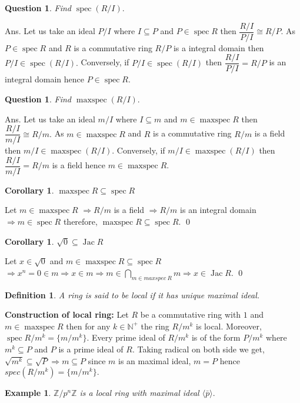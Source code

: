 \documentclass[11pt]{amsart}
\newtheorem{definition}[theorem]{Definition}%
\newtheorem{qns}[theorem]{Question}
\newtheorem{example}[theorem]{Example}%
\newtheorem{corollary}[theorem]{Corollary}%
\newcommand{\ZZ}{\mathbb Z}
\newcommand{\NN}{\mathbb N}
\newcommand{\gen}[1]{\langle#1\rangle}
\begin{document}
\begin{qns}
Find $\operatorname{spec}(R/I).$
\end{qns}
Ans. Let us take an ideal $P/I$ where $I\subseteq P$ and $P\in \operatorname{spec}R$ then $\dfrac{R/I}{P/I}\cong R/P.$ As $P\in \operatorname{spec}R$ and $R$ is a commutative ring $R/P$ is a integral domain then $P/I\in \operatorname{spec}(R/I).$ Conversely, if $P/I\in \operatorname{spec}(R/I)$ then $\dfrac{R/I}{P/I}=R/P$ is an integral domain hence $P\in \operatorname{spec}R.$ 
\begin{qns}
Find $\operatorname{maxspec}(R/I).$
\end{qns}
Ans. Let us take an ideal $m/I$ where $I\subseteq m$ and $m\in \operatorname{maxspec}R$ then $\dfrac{R/I}{m/I}\cong R/m.$ As $m\in \operatorname{maxspec}R$ and $R$ is a commutative ring $R/m$ is a field then $m/I\in \operatorname{maxspec}(R/I).$ Conversely, if $m/I\in \operatorname{maxspec}(R/I)$ then $\dfrac{R/I}{m/I}=R/m$ is a field hence $m\in \operatorname{maxspec}R.$ 
\begin{corollary}
$\operatorname{maxspec}R\subseteq \operatorname{spec}R$
\end{corollary}
\proof Let $m\in \operatorname{maxspec}R$ $\Rightarrow R/m$ is a field $\Rightarrow R/m$ is an integral domain $\Rightarrow m\in \operatorname{spec}R$ therefore, $\operatorname{maxspec}R\subseteq \operatorname{spec}R.$ \qed
\begin{corollary}
$\sqrt{0}\subseteq \operatorname{Jac}R$
\end{corollary}
\proof Let $x\in \sqrt{0}$ and $m\in \operatorname{maxspec}R\subseteq \operatorname{spec}R$ $\Rightarrow x^n=0\in m\Rightarrow x\in m \Rightarrow m\in \displaystyle\bigcap_{m\in maxspec~R} m \Rightarrow x\in \operatorname{Jac}R.$ \qed
\begin{definition}
A ring is said to be local if it has unique maximal ideal.
\end{definition}

\textbf{Construction of local ring:} Let $R$ be a commutative ring with $1$ and $m\in \operatorname{maxspec}R$ then for any $k\in {\NN}^+$ the ring $R/m^k$ is local. Moreover, $\operatorname{spec}R/m^k=\{m/m^k\}.$ Every prime ideal of $R/m^k$ is of the form $P/m^k$ where $m^k\subseteq P$ and $P$ is a prime ideal of $R.$ Taking radical on both side we get, $\sqrt{m^k}\subseteq \sqrt{P} \Rightarrow m\subseteq P$ since $m$ is an maximal ideal, $m=P$ hence $spec(R/m^k)=\{m/m^k\}.$

\begin{example}
${\ZZ}/p^n{\ZZ}$ is a local ring with maximal ideal $\gen{\bar{p}}.$
\end{example}
\end{document}
